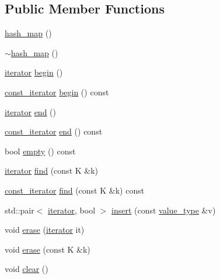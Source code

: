 \subsection*{Public Member Functions}
\begin{DoxyCompactItemize}
\item 
\hyperlink{classasio_1_1detail_1_1hash__map_a97bdbbcd79dc7347eed9f113ca3fff61}{hash\+\_\+map} ()
\item 
\hyperlink{classasio_1_1detail_1_1hash__map_a969bddbb9c2d201671f5c686ad989bdd}{$\sim$hash\+\_\+map} ()
\item 
\hyperlink{classasio_1_1detail_1_1hash__map_a0f24b597db0331311f431ad015e3b558}{iterator} \hyperlink{classasio_1_1detail_1_1hash__map_a5c3ec0e730ae8e63517eb55684d220b8}{begin} ()
\item 
\hyperlink{classasio_1_1detail_1_1hash__map_ab0e2b29d40bba3e3c772850e6dbca0d5}{const\+\_\+iterator} \hyperlink{classasio_1_1detail_1_1hash__map_aca6b823a6a2432c7bf4cc3ea1271bf1e}{begin} () const 
\item 
\hyperlink{classasio_1_1detail_1_1hash__map_a0f24b597db0331311f431ad015e3b558}{iterator} \hyperlink{classasio_1_1detail_1_1hash__map_a0192be90c21f4958f31f7ab622b1241d}{end} ()
\item 
\hyperlink{classasio_1_1detail_1_1hash__map_ab0e2b29d40bba3e3c772850e6dbca0d5}{const\+\_\+iterator} \hyperlink{classasio_1_1detail_1_1hash__map_a583dcabef2f0c31d0feb5a89a8b27111}{end} () const 
\item 
bool \hyperlink{classasio_1_1detail_1_1hash__map_a68a1b737de1b598066a17d965c55134a}{empty} () const 
\item 
\hyperlink{classasio_1_1detail_1_1hash__map_a0f24b597db0331311f431ad015e3b558}{iterator} \hyperlink{classasio_1_1detail_1_1hash__map_a83c6995945fab9f91e9b9e21f11a9a36}{find} (const K \&k)
\item 
\hyperlink{classasio_1_1detail_1_1hash__map_ab0e2b29d40bba3e3c772850e6dbca0d5}{const\+\_\+iterator} \hyperlink{classasio_1_1detail_1_1hash__map_ae29f9b8738e4f6c08561d7a0d389c2d9}{find} (const K \&k) const 
\item 
std\+::pair$<$ \hyperlink{classasio_1_1detail_1_1hash__map_a0f24b597db0331311f431ad015e3b558}{iterator}, bool $>$ \hyperlink{classasio_1_1detail_1_1hash__map_a957b57218bcc77e95c27f325888f0995}{insert} (const \hyperlink{classasio_1_1detail_1_1hash__map_a951382d3db34c58e0a38adccba7f084e}{value\+\_\+type} \&v)
\item 
void \hyperlink{classasio_1_1detail_1_1hash__map_a5509b98f756a8abad9b2bc07c8611992}{erase} (\hyperlink{classasio_1_1detail_1_1hash__map_a0f24b597db0331311f431ad015e3b558}{iterator} it)
\item 
void \hyperlink{classasio_1_1detail_1_1hash__map_a71812253f8a1338cf0d934636d3f00cc}{erase} (const K \&k)
\item 
void \hyperlink{classasio_1_1detail_1_1hash__map_acc2e64b9972f4663153bed4aa080eb2b}{clear} ()
\end{DoxyCompactItemize}


